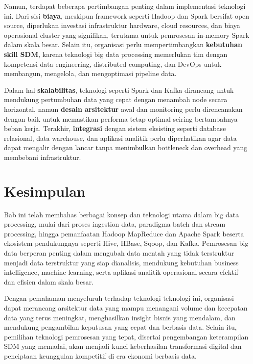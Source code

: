 Namun, terdapat beberapa pertimbangan penting dalam implementasi teknologi ini. Dari sisi \textbf{biaya}, meskipun framework seperti Hadoop dan Spark bersifat open source, diperlukan investasi infrastruktur hardware, cloud resources, dan biaya operasional cluster yang signifikan, terutama untuk pemrosesan in-memory Spark dalam skala besar. Selain itu, organisasi perlu mempertimbangkan \textbf{kebutuhan skill SDM}, karena teknologi big data processing memerlukan tim dengan kompetensi data engineering, distributed computing, dan DevOps untuk membangun, mengelola, dan mengoptimasi pipeline data.

Dalam hal \textbf{skalabilitas}, teknologi seperti Spark dan Kafka dirancang untuk mendukung pertumbuhan data yang cepat dengan menambah node secara horizontal, namun \textbf{desain arsitektur} awal dan monitoring perlu direncanakan dengan baik untuk memastikan performa tetap optimal seiring bertambahnya beban kerja. Terakhir, \textbf{integrasi} dengan sistem eksisting seperti database relasional, data warehouse, dan aplikasi analitik perlu diperhatikan agar data dapat mengalir dengan lancar tanpa menimbulkan bottleneck dan overhead yang membebani infrastruktur.

\section{Kesimpulan}

Bab ini telah membahas berbagai konsep dan teknologi utama dalam big data processing, mulai dari proses ingestion data, paradigma batch dan stream processing, hingga pemanfaatan Hadoop MapReduce dan Apache Spark beserta ekosistem pendukungnya seperti Hive, HBase, Sqoop, dan Kafka. Pemrosesan big data berperan penting dalam mengubah data mentah yang tidak terstruktur menjadi data terstruktur yang siap dianalisis, mendukung kebutuhan business intelligence, machine learning, serta aplikasi analitik operasional secara efektif dan efisien dalam skala besar.

Dengan pemahaman menyeluruh terhadap teknologi-teknologi ini, organisasi dapat merancang arsitektur data yang mampu menangani volume dan kecepatan data yang terus meningkat, menghasilkan insight bisnis yang mendalam, dan mendukung pengambilan keputusan yang cepat dan berbasis data. Selain itu, pemilihan teknologi pemrosesan yang tepat, disertai pengembangan keterampilan SDM yang memadai, akan menjadi kunci keberhasilan transformasi digital dan penciptaan keunggulan kompetitif di era ekonomi berbasis data.
